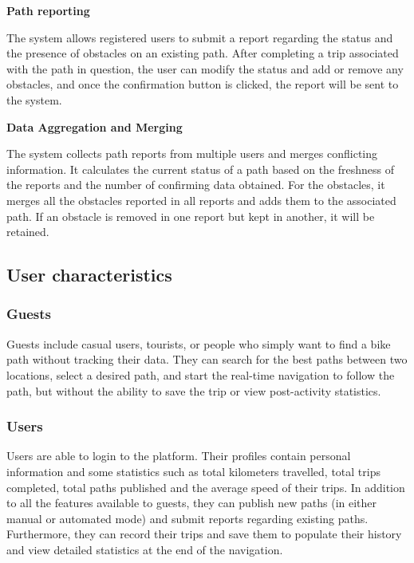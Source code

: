     \vspace{2mm}
    \noindent
    \textbf{Path reporting} 
    \vspace{1mm}
    
    \noindent
    The system allows registered users to submit a report regarding the status and the presence of obstacles on an existing path.
    After completing a trip associated with the path in question, the user can modify the status and add or remove any obstacles, and once the confirmation button is clicked, the report will be sent to the system.

    \vspace{2mm}
    \noindent
    \textbf{Data Aggregation and Merging} 
    \vspace{1mm}
    
    \noindent
    The system collects path reports from multiple users and merges conflicting information. It calculates the current status of a path based on the freshness of the reports and the number of confirming data obtained. For the obstacles, it merges all the obstacles reported in all reports and adds them to the associated path. If an obstacle is removed in one report but kept in another, it will be retained. 

    \subsection{User characteristics}

    \subsubsection{Guests}
    \noindent
    Guests include casual users, tourists, or people who simply want to find a bike path without tracking their data. They can search for the best paths between two locations, select a desired path, and start the real-time navigation to follow the path, but without the ability to save the trip or view post-activity statistics.

    \subsubsection{Users}
    \noindent
    Users are able to login to the platform. Their profiles contain personal information and some statistics such as total kilometers travelled, total trips completed, total paths published and the average speed of their trips. In addition to all the features available to guests, they can publish new paths (in either manual or automated mode) and submit reports regarding existing paths. Furthermore, they can record their trips and save them to populate their history and view detailed statistics at the end of the navigation.

